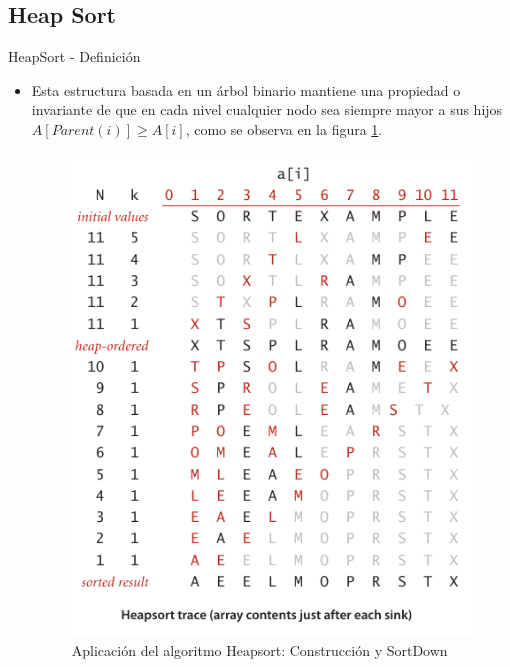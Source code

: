 \documentclass[11pt]{beamer}
\begin{document}
		\subsection{Heap Sort}
		    \begin{frame}{HeapSort - Definición}
    		     \begin{itemize}
    		         \item Esta estructura basada en un \'{a}rbol binario mantiene una propiedad o invariante de que en cada nivel cualquier nodo sea siempre mayor a sus hijos $A[Parent(i)] \geq A[i]$, como se observa en la figura \ref{fig:heap_trace}.
    		         
    		        \begin{figure}[H]
    		            \centering	 \includegraphics[scale=0.40]{img/heapsort_trace.png}
                        \caption{Aplicaci\'{o}n del algoritmo Heapsort: Construcción y SortDown \cite{Algorithms}}
                        \label{fig:heap_trace}
                    \end{figure}
    		     \end{itemize}
    		\end{frame}
\end{document}
